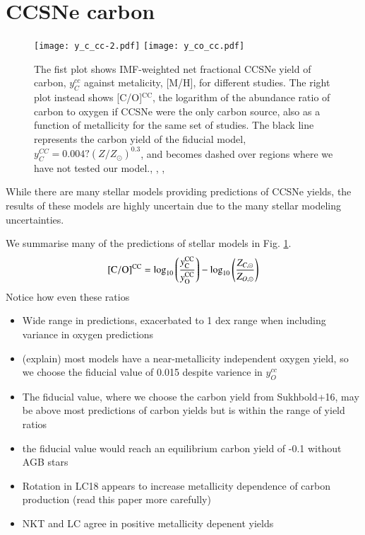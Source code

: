 \documentclass[12pt,oneside]{book}
\newcommand{\sun}{\ensuremath{\odot}}
\begin{document}
\section{CCSNe carbon}

\begin{figure}[htp]
    \texttt{[image: y\_c\_cc-2.pdf]}
    \texttt{[image: y\_co\_cc.pdf]}
    \caption{The fist plot shows IMF-weighted net fractional CCSNe yield of
        carbon, $y_C^{cc}$ against metalicity, [M/H], for different studies.
        The right plot instead shows [C/O]$^\text{CC}$, the logarithm of the
        abundance ratio of carbon to oxygen if CCSNe were the only carbon
        source, also as a function of metallicity for the same set of studies.
        The black line represents the carbon yield of the fiducial model,
        $y_C^{CC} = 0.004? (Z/Z_{\sun})^{0.3}$, and becomes dashed over regions
        where we have not tested our model.\citep{NKT13}, \citep{LC18},
        \citep{sukhbold+16}, \citep{WW95}
 }
    \label{fig:y_cc}
\end{figure}

While there are many stellar models providing predictions of CCSNe yields, the results of these models are highly uncertain due to the many stellar modeling uncertainties. 

We summarise many of the predictions of stellar models in Fig. \ref{fig:y_cc}. 
\begin{equation}
    {\rm [C/O]^{CC}} = \log_{10}\left( \frac{y_{\rm C}^{\rm CC}}{y_{\rm O}^{\rm CC}}\right) - \log_{10} \left( \frac{Z_{C, \sun }}{Z_{O, \sun }} \right)
\end{equation}
Notice how even these ratios 



    \begin{itemize}
        \item Wide range in predictions, exacerbated to 1 dex range when including variance in oxygen predictions
        \item (explain) most models have a near-metallicity independent oxygen yield, so we choose the fiducial value of 0.015 despite varience in $y_O^{cc}$
        \item The fiducial value, where we choose the carbon yield from Sukhbold+16, may be above most predictions of carbon yields but is within the range of yield ratios
        \item the fiducial value would reach an equilibrium carbon yield of -0.1 without AGB stars
        \item Rotation in LC18 appears to increase metallicity dependence of carbon production (read this paper more carefully)
        \item NKT and LC agree in positive metallicity depenent yields
    \end{itemize}
    
\end{document}
